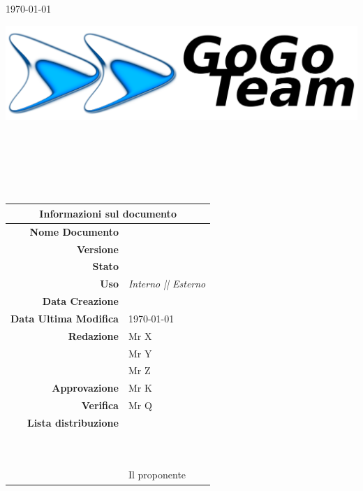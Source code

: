\thispagestyle{empty}

\begin{titlepage}

\begin{center}
	\today \\
	\vspace{1cm}
	\begin{Huge}
		\textbf{\ggt}
	\end{Huge}
	
	\vspace{2cm}
	
	\includegraphics[scale=0.75]{../imgs/gogoTeamLogo.png}
	
	\vspace{2cm}
	
\HRule \\[0.4cm]
	\begin{Huge}
		{\huge \bfseries \titoloDocumento}\\[0.4cm]
	\end{Huge}
\HRule \\[2.5cm]
	
	\vfill

\begin{table}[h]
\begin{center}
\begin{tabular}{r | l}
\multicolumn{2}{c}{\textbf{Informazioni sul documento}}\\
\midrule
\textbf{Nome Documento}	&	\titoloDocumento	\\
\textbf{Versione}	&	\versione	\\
\textbf{Stato}	&	\emph{\stato}	\\
\textbf{Uso}	&	\emph{Interno || Esterno}	\\
\textbf{Data Creazione}	&	\dataCreazione	\\
\textbf{Data Ultima Modifica}	&	\today	\\
\textbf{Redazione}	&	Mr X	\\
\ 	&	Mr Y	\\
\ 	&	Mr Z	\\
\textbf{Approvazione}	&	Mr K	\\
\textbf{Verifica}	&	Mr Q	\\
\textbf{Lista distribuzione}	&	\ggt 	\\
\ 	&	\Vardanega	\\
\ 	&	\Cardin	\\
\ 	&	Il proponente \Zucchetti	\\

\end{tabular}
\end{center}
\end{table}

\end{center}

\end{titlepage}